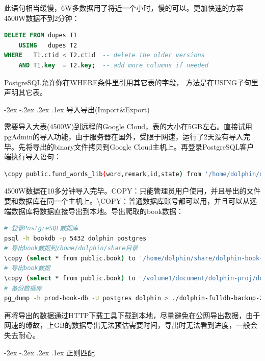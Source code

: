 \documentclass[8pt]{book}
\makeatletter
\numberwithin{dummy}{section}
\theoremstyle{ocrenumbox}
\theoremstyle{blacknumex}
\theoremstyle{blacknumbox}
\theoremstyle{ocrenum}
\renewcommand\paragraph{\@startsection{paragraph}{4}{\z@}
	{-2ex \@plus-.2ex \@minus .2ex}
	{.1ex}
	{\normalfont\small\sffamily\bfseries}}
\makeatother
\begin{document}
此语句相当缓慢，6W多数据用了将近一个小时，慢的可以。更加快速的方案4500W数据不到2分钟：

\begin{lstlisting}[language=SQL]
DELETE FROM dupes T1
    USING   dupes T2
WHERE   T1.ctid < T2.ctid  -- delete the older versions
    AND T1.key  = T2.key;  -- add more columns if needed
\end{lstlisting}

PostgreSQL允许你在WHERE条件里引用其它表的字段， 方法是在USING子句里声明其它表。

\paragraph{导入导出(Import\&Export)}

需要导入大表(4500W)到远程的Google Cloud，表的大小在5GB左右。直接试用pgAdmin的导入功能，由于服务器在国外，受限于网速，运行了2天没有导入完毕。先将导出的binary文件拷贝到Google Cloud主机上。再登录PostgreSQL客户端执行导入语句：

\begin{lstlisting}[language=Bash]
\copy public.fund_words_lib(word,remark,id,state) from '/home/dolphin/dolphin-words' encoding 'utf8';
\end{lstlisting}

4500W数据在10多分钟导入完毕。COPY：只能管理员用户使用，并且导出的文件要和数据库在同一个主机上。\textbackslash COPY：普通数据库账号都可以用，并且可以从远端数据库将数据直接导出到本地。导出爬取的book数据：

\begin{lstlisting}[language=Bash]
# 登录PostgreSQL数据库
psql -h bookdb -p 5432 dolphin postgres
# 导出book数据到/home/dolphin/share目录
\copy (select * from public.book) to '/home/dolphin/share/dolphin-book-binary-bak-201902062112' with Binary;
# 导出book数据
\copy (select * from public.book) to '/volume1/document/dolphin-proj/dolphin-book-text-bak-201902091012'
# 备份数据库
pg_dump -h prod-book-db -U postgres dolphin > ./dolphin-fulldb-backup-201903231013.bak
\end{lstlisting}

再将导出的数据通过HTTP下载工具下载到本地，尽量避免在公网导出数据，由于网速的缘故，上GB的数据导出无法预估需要时间，导出时无法看到进度，一般会失去耐心。

\paragraph{正则匹配}
\end{document}
